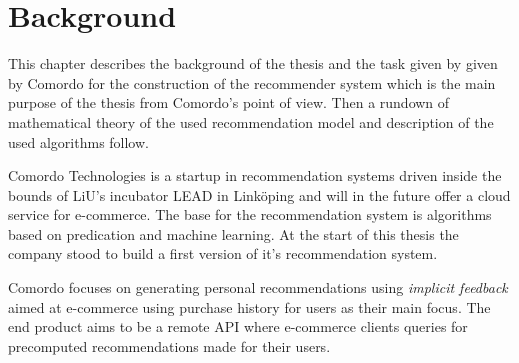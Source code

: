 
\chapter{Background}\label{cha:background}

This chapter describes the background of the thesis and the task given by given by Comordo for the construction of the recommender system which is the main purpose of the thesis from Comordo's point of view. Then a rundown of mathematical theory of the used recommendation model and description of the used algorithms follow.


Comordo Technologies is a startup in recommendation systems driven inside the bounds of LiU's incubator LEAD in Linköping and will in the future offer a cloud service for e-commerce. The base for the recommendation system is algorithms based on predication and machine learning. At the start of this thesis the company stood to build a first version of it's recommendation system.

Comordo focuses on generating personal recommendations using \textit{implicit feedback} aimed at e-commerce using purchase history for users as their main focus. The end product aims to be a remote API where e-commerce clients queries for precomputed recommendations made for their users.


\newpage





